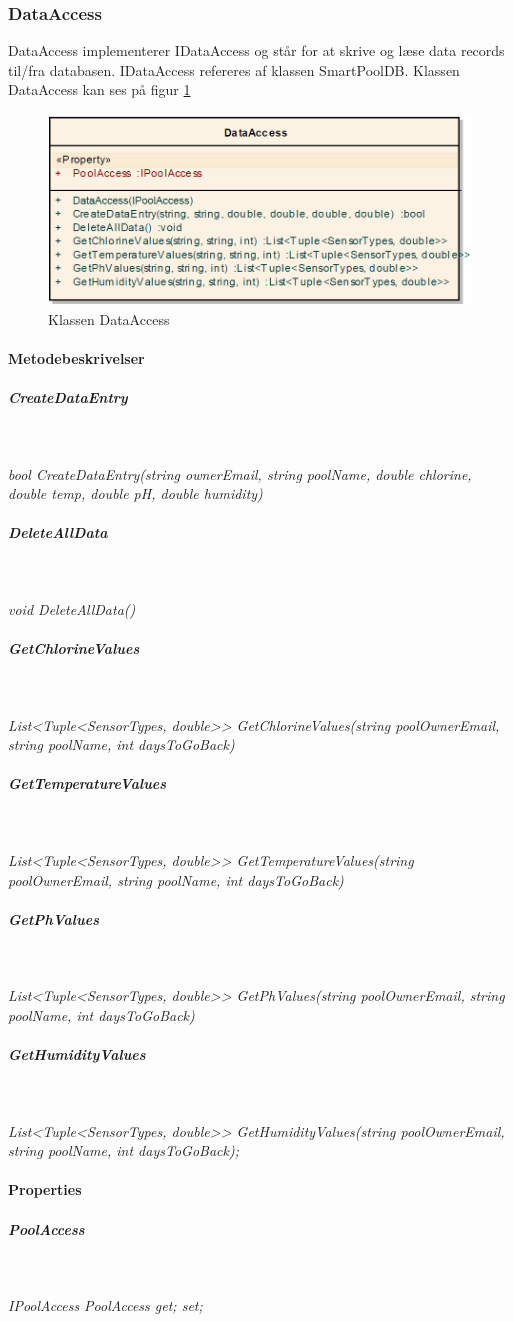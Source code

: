 \subsubsection{DataAccess}
DataAccess implementerer IDataAccess og står for at skrive og læse data records til/fra databasen.
IDataAccess refereres af klassen SmartPoolDB. Klassen DataAccess kan ses på figur \ref{fig:dataAccessClassNoInherit}

\begin{figure}
\centering
\includegraphics[width=0.7\linewidth]{figs/implementering/dataAccessClassNoInherit}
\caption{Klassen DataAccess}
\label{fig:dataAccessClassNoInherit}
\end{figure}


\paragraph{Metodebeskrivelser}

\subparagraph{CreateDataEntry}\

\textit{bool CreateDataEntry(string ownerEmail, string poolName, double chlorine, double temp, double pH, double humidity)}


\subparagraph{DeleteAllData}\

\textit{void DeleteAllData()}

\subparagraph{GetChlorineValues}\

\textit{List<Tuple<SensorTypes, double>> GetChlorineValues(string poolOwnerEmail, string poolName, int daysToGoBack)}

\subparagraph{GetTemperatureValues}\

\textit{List<Tuple<SensorTypes, double>> GetTemperatureValues(string poolOwnerEmail, string poolName, int daysToGoBack)}

\subparagraph{GetPhValues}\

\textit{List<Tuple<SensorTypes, double>> GetPhValues(string poolOwnerEmail, string poolName, int daysToGoBack)}

\subparagraph{GetHumidityValues}\

\textit{List<Tuple<SensorTypes, double>> GetHumidityValues(string poolOwnerEmail, string poolName, int daysToGoBack);}

\paragraph{Properties}

\subparagraph{PoolAccess}\

\textit{IPoolAccess PoolAccess { get; set; }}